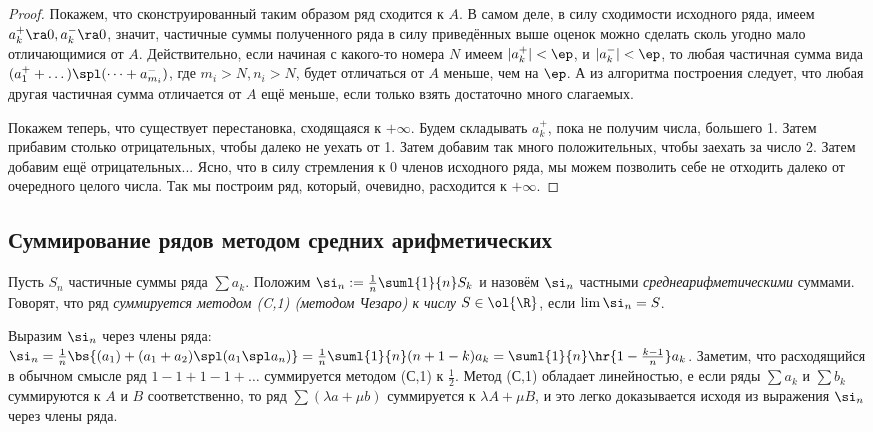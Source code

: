 \documentclass[a4paper]{article}
\begin{document}
\begin{proof}
Покажем, что сконструированный таким образом ряд сходится к $A$. В самом деле, в силу сходимости исходного ряда, имеем
$a_k^+ \ra 0, a_k^- \ra 0$, значит, частичные суммы полученного ряда в силу приведённых выше оценок можно сделать сколь угодно мало
отличающимися от $A$. Действительно, если начиная с какого-то номера $N$ имеем $|a_k^+| < \ep$, и $|a_k^-| < \ep$, то любая частичная
сумма вида $(a_1^+ + \dots)\spl (\dots + a_{m_i}^-)$, где $m_i > N, n_i > N$, будет отличаться от $A$ меньше, чем на $\ep$. А из алгоритма построения следует,
что любая другая частичная сумма отличается от $A$ ещё меньше, если только взять достаточно много слагаемых.

Покажем теперь, что существует перестановка, сходящаяся к $+\infty$. Будем складывать $a_k^+$, пока не получим числа, большего 1. Затем прибавим
столько отрицательных, чтобы далеко не уехать от 1. Затем добавим так много положительных, чтобы заехать за число 2. Затем добавим ещё отрицательных...
Ясно, что в силу стремления к 0 членов исходного ряда, мы можем позволить себе не отходить далеко от очередного целого числа. Так мы построим ряд,
который, очевидно, расходится к $+\infty$.
\end{proof}

\subsection{Суммирование рядов методом средних арифметических}

\begin{df}
Пусть $S_n$ частичные суммы ряда $\sum a_k$. Положим $\si_n := \frac{1}{n}\suml{1}{n}S_k$ и назовём $\si_n$ частными
\emph{среднеарифметическими} суммами. Говорят, что ряд \emph{суммируется методом (C,1) (методом Чезаро) к числу} $S \in \ol{\R}$, если
$\lim \si_n=S$.
\end{df}

Выразим $\si_n$ через члены ряда: $\si_n = \frac{1}{n}\bs{(a_1) + (a_1 + a_2) \spl (a_1 \spl a_n)}=
\frac{1}{n}\suml{1}{n}(n+1-k)a_k= \suml{1}{n}\hr{1-\frac{k-1}{n}} a_k$. Заметим, что расходящийся в обычном смысле ряд
$1-1+1-1+\dots$ суммируется методом (С,1) к $\frac{1}{2}$. Метод (С,1) обладает
линейностью, е если ряды $\sum a_k$ и $\sum b_k$ суммируются к $A$ и $B$ соответственно, то ряд $\sum (\lambda a+\mu b)$ суммируется
к $\lambda A + \mu B$, и это легко доказывается исходя из выражения $\si_n$ через члены ряда.
\end{document}
